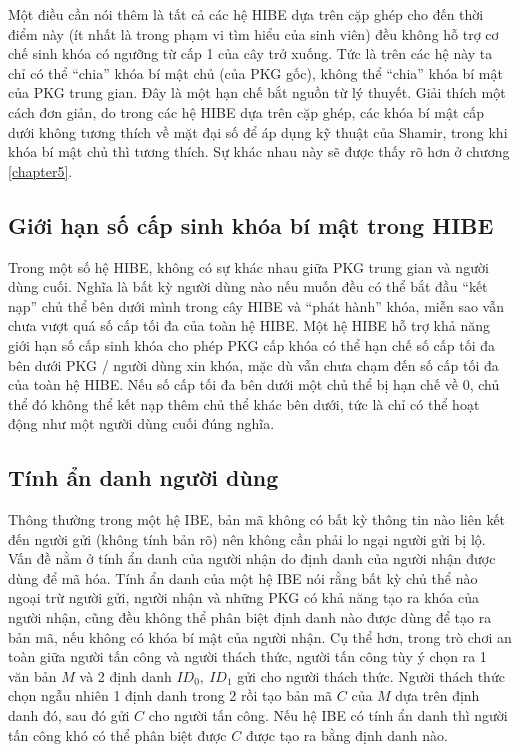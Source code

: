 \documentclass[class=report, crop=false]{standalone}
\begin{document}
			Một điều cần nói thêm là tất cả các hệ HIBE dựa trên cặp ghép cho đến thời điểm này (ít nhất là trong phạm vi tìm hiểu của sinh viên) đều không hỗ trợ cơ chế sinh khóa có ngưỡng từ cấp 1 của cây trở xuống. Tức là trên các hệ này ta chỉ có thể ``chia'' khóa bí mật chủ (của PKG gốc), không thể ``chia'' khóa bí mật của PKG trung gian. Đây là một hạn chế bắt nguồn từ lý thuyết. Giải thích một cách đơn giản, do trong các hệ HIBE dựa trên cặp ghép, các khóa bí mật cấp dưới không tương thích về mặt đại số để áp dụng kỹ thuật của Shamir, trong khi khóa bí mật chủ thì tương thích. Sự khác nhau này sẽ được thấy rõ hơn ở chương \ref{chapter5}.
		\subsection{Giới hạn số cấp sinh khóa bí mật trong HIBE}
			Trong một số hệ HIBE, không có sự khác nhau giữa PKG trung gian và người dùng cuối. Nghĩa là bất kỳ người dùng nào nếu muốn đều có thể bắt đầu ``kết nạp'' chủ thể bên dưới mình trong cây HIBE và ``phát hành'' khóa, miễn sao vẫn chưa vượt quá số cấp tối đa của toàn hệ HIBE. Một hệ HIBE hỗ trợ khả năng giới hạn số cấp sinh khóa cho phép PKG cấp khóa có thể hạn chế số cấp tối đa bên dưới PKG / người dùng xin khóa, mặc dù vẫn chưa chạm đến số cấp tối đa của toàn hệ HIBE. Nếu số cấp tối đa bên dưới một chủ thể bị hạn chế về $0$, chủ thể đó không thể kết nạp thêm chủ thể khác bên dưới, tức là chỉ có thể hoạt động như một người dùng cuối đúng nghĩa.
		\subsection{Tính ẩn danh người dùng}
			Thông thường trong một hệ IBE, bản mã không có bất kỳ thông tin nào liên kết đến người gửi (không tính bản rõ) nên không cần phải lo ngại người gửi bị lộ. Vấn đề nằm ở tính ẩn danh của người nhận do định danh của người nhận được dùng để mã hóa. Tính ẩn danh của một hệ IBE nói rằng bất kỳ chủ thể nào ngoại trừ người gửi, người nhận và những PKG có khả năng tạo ra khóa của người nhận, cũng đều không thể phân biệt định danh nào được dùng để tạo ra bản mã, nếu không có khóa bí mật của người nhận. Cụ thể hơn, trong trò chơi an toàn giữa người tấn công và người thách thức, người tấn công tùy ý chọn ra 1 văn bản $M$ và 2 định danh $ID_0,\ ID_1$ gửi cho người thách thức. Người thách thức chọn ngẫu nhiên 1 định danh trong 2 rồi tạo bản mã $C$ của $M$ dựa trên định danh đó, sau đó gửi $C$ cho người tấn công. Nếu hệ IBE có tính ẩn danh thì người tấn công khó có thể phân biệt được $C$ được tạo ra bằng định danh nào.
\end{document}
